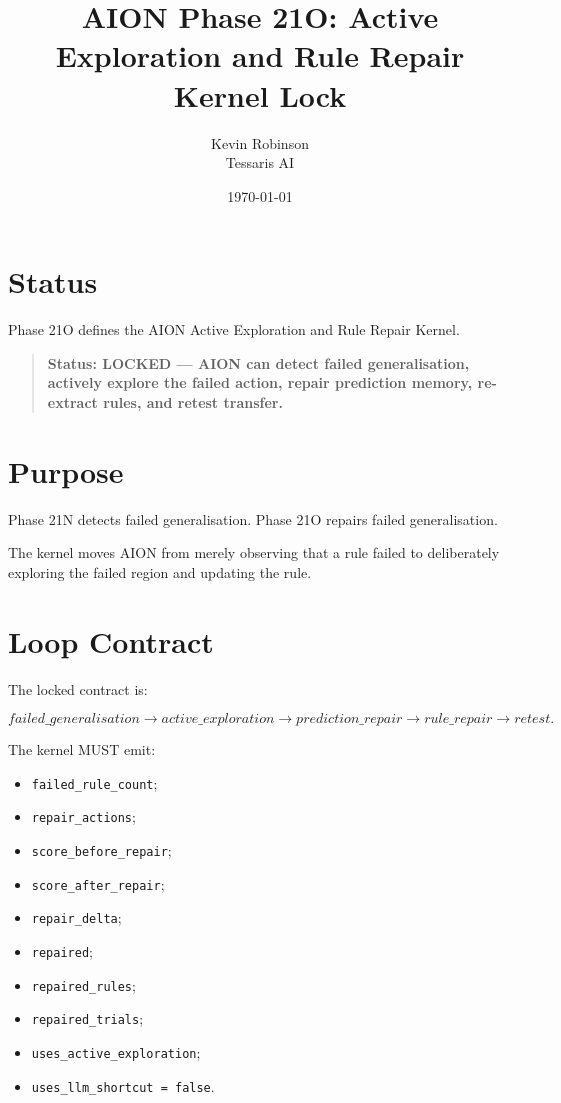 \documentclass[11pt,a4paper]{article}
\title{\textbf{AION Phase 21O: Active Exploration and Rule Repair Kernel Lock}}
\author{Kevin Robinson\\Tessaris AI}
\date{\today}
\begin{document}
\maketitle

\section{Status}

Phase 21O defines the AION Active Exploration and Rule Repair Kernel.

\begin{quote}
\textbf{Status: LOCKED --- AION can detect failed generalisation, actively explore the failed action, repair prediction memory, re-extract rules, and retest transfer.}
\end{quote}

\section{Purpose}

Phase 21N detects failed generalisation. Phase 21O repairs failed generalisation.

The kernel moves AION from merely observing that a rule failed to deliberately exploring the failed region and updating the rule.

\section{Loop Contract}

The locked contract is:

\[
failed\_generalisation \rightarrow active\_exploration
\rightarrow prediction\_repair \rightarrow rule\_repair \rightarrow retest.
\]

The kernel MUST emit:

\begin{itemize}
  \item \texttt{failed\_rule\_count};
  \item \texttt{repair\_actions};
  \item \texttt{score\_before\_repair};
  \item \texttt{score\_after\_repair};
  \item \texttt{repair\_delta};
  \item \texttt{repaired};
  \item \texttt{repaired\_rules};
  \item \texttt{repaired\_trials};
  \item \texttt{uses\_active\_exploration};
  \item \texttt{uses\_llm\_shortcut = false}.
\end{itemize}
\end{document}

